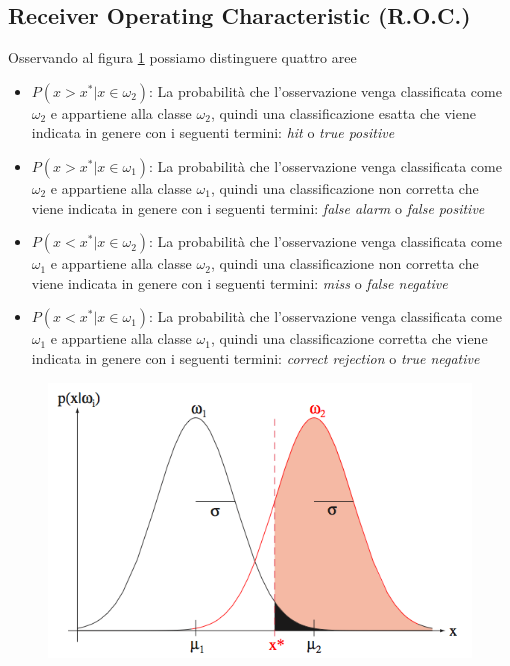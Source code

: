 \subsection{Receiver Operating Characteristic (R.O.C.)}
Osservando al figura \ref{errore1} possiamo distinguere quattro aree
\begin{itemize}
\item $P(x > x^* | x \in \omega_2)$: La probabilità che l'osservazione venga classificata come $\omega_2$ e appartiene alla classe $\omega_2$, quindi una classificazione esatta che viene indicata in genere con i seguenti termini: \emph{hit} o \emph{true positive}
\item $P(x > x^* | x \in \omega_1)$:  La probabilità che l'osservazione venga classificata come $\omega_2$ e appartiene alla classe $\omega_1$, quindi una classificazione non corretta che viene indicata in genere con i seguenti termini: \emph{false alarm} o \emph{false positive} 
\item $P(x < x^* | x \in \omega_2)$:  La probabilità che l'osservazione venga classificata come $\omega_1$ e appartiene alla classe $\omega_2$, quindi una classificazione non corretta che viene indicata in genere con i seguenti termini: \emph{miss} o \emph{false negative}
\item $P(x < x^* | x \in \omega_1)$:  La probabilità che l'osservazione venga classificata come $\omega_1$ e appartiene alla classe $\omega_1$, quindi una classificazione corretta che viene indicata in genere con i seguenti termini: \emph{correct rejection} o \emph{true negative}
\end{itemize}
\begin{figure}
\centering
\includegraphics[scale=0.5]{img/errore1.png}
\caption{}
\label{errore1}
\end{figure}
